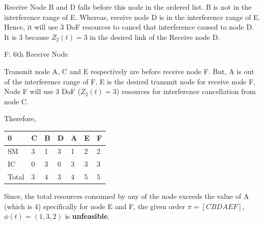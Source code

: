 \documentclass[a4paper,oneside,12pt]{report}
\begin{document}
\begin{enumerate} [(i)]
Receive Node B and D falls before this node in the ordered list. B is not in the interference range of E. Whereas, receive node D is in the interference range of E. Hence, it will use 3 DoF resources to cancel that interference caused to node D. It is 3 because $Z_2(t) = 3$ in the desired link of the Receive node D.

F: 6th Receive Node

Transmit node A, C and E respectively are before receive node F.
But, A is out of the interference range of F,
E is the desired transmit node for receive node F,
Node F will use 3 DoF ($Z_2(t) = 3$) resources for interference cancellation from node C.

Therefore,

\begin{center}
  \begin{tabular}{ l | l | l | l | l | l | l }
    \hline
		0			& C & B & D & A & E & F \\ \hline
    SM 		& 3 & 1 & 3 & 1 & 2 & 2 \\ \hline
    IC 		& 0 & 3 & 0 & 3 & 3 & 3 \\ \hline
		Total & 3 & 4 & 3 & 4 & 5 & 5	\\ \hline
  \end{tabular}
\end{center}

Since, the total resources consumed by any of the node exceeds the value of A (which is 4) specifically for node E and F, the given order $\pi=[C B D A E F]$, $\phi(t) = (1, 3, 2)$ is \textbf{unfeasible}.

\end{enumerate}
\end{document}

